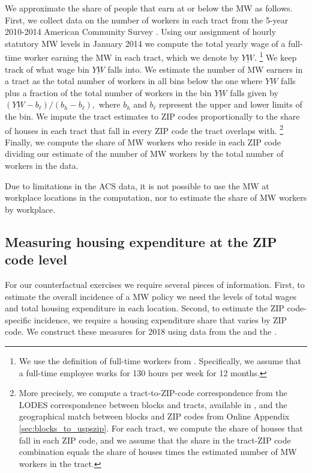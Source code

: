 We approximate the share of people that earn at or below the MW as follows.
First, we collect data on the number of workers in each tract from the 5-year 
2010-2014 American Community Survey \parencite{CensusACS}.
Using our assignment of hourly statutory MW levels in January 2014 we compute 
the total yearly wage of a full-time worker earning the MW in each tract, which 
we denote by $\underline{YW}$.%
\footnote{We use the definition of full-time workers from \textcite{IRSfulltime}.
Specifically, we assume that a full-time employee works for 130 hours per week
for 12 months.}
We keep track of what wage bin $\underline{YW}$ falls into.
We estimate the number of MW earners in a tract as the total number of workers 
in all bins below the one where $\underline{YW}$ falls plus a fraction of the 
total number of workers in the bin $\underline{YW}$ falls given by 
$\left(\underline{YW} - b_\ell\right)/\left(b_h - b_\ell\right),$
where $b_h$ and $b_\ell$ represent the upper and lower limits of 
the bin.
We impute the tract estimates to ZIP codes proportionally to the share of 
houses in each tract that fall in every ZIP code the tract overlaps with.%
\footnote{More precisely, we compute a tract-to-ZIP-code correspondence from
the LODES correspondence between blocks and tracts, available in 
\textcite{CensusLODES}, and the geographical match between blocks and ZIP codes
from Online Appendix \ref{sec:blocks_to_uspszip}.
For each tract, we compute the share of houses that fall in each ZIP code, and 
we assume that the share in the tract-ZIP code combination equals the share of
houses times the estimated number of MW workers in the tract.}
Finally, we compute the share of MW workers who reside in each ZIP 
code dividing our estimate of the number of MW workers by the total
number of workers in the data.

Due to limitations in the ACS data, it is not possible to use the MW at 
workplace locations in the computation, nor to estimate the share of MW workers 
by workplace.

\subsection{Measuring housing expenditure at the ZIP code level}
\label{sec:measure_housing_expenditure}

For our counterfactual exercises we require several pieces of information.
First, to estimate the overall incidence of a MW policy we need the levels 
of total wages and total housing expenditure in each location.
Second, to estimate the ZIP code-specific incidence, we require a housing 
expenditure share that varies by ZIP code.
We construct these measures for 2018 using data from the \textcite{IRS} and
the \textcite{hudSAFMR}.

